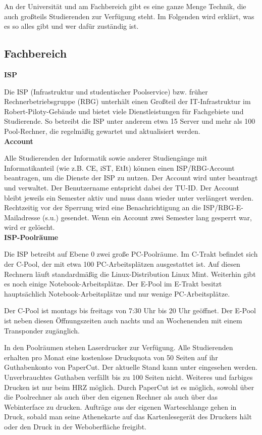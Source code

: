 {An der Universität und am Fachbereich gibt es eine ganze Menge Technik, die auch großteils Studierenden zur Verfügung steht. Im Folgenden wird erklärt, was es so alles gibt und wer dafür zuständig ist.
}{
\subsection*{Fachbereich}

\noindent\textbf{ISP}

Die ISP (Infrastruktur und studentischer Poolservice) \footnotemark[1] bzw. früher Rechnerbetriebsgruppe (RBG) unterhält einen Großteil der IT-Infrastruktur im Robert-Piloty-Gebäude und bietet viele Dienstleistungen für Fachgebiete und Studierende. So betreibt die ISP unter anderem etwa 15 Server und mehr als 100 Pool-Rechner, die regelmäßig gewartet und aktualisiert werden.\\

\noindent\textbf{Account}

Alle Studierenden der Informatik sowie anderer Studiengänge mit Informatikanteil (wie z.B. CE, iST, EtIt) können einen ISP/RBG-Account beantragen, um die Dienste der ISP zu nutzen. Der Account wird unter \footnotemark[2] beantragt und verwaltet. Der Benutzername entspricht dabei der TU-ID. Der Account bleibt jeweils ein Semester aktiv und muss dann wieder unter \footnotemark[2] verlängert werden. Rechtzeitig vor der Sperrung wird eine Benachrichtigung an die ISP/RBG-E-Mailadresse (s.u.) gesendet. Wenn ein Account zwei Semester lang gesperrt war, wird er gelöscht.\\

\noindent\textbf{ISP-Poolräume}

Die ISP betreibt auf Ebene 0 zwei große PC-Poolräume. Im C-Trakt befindet sich der C-Pool, der mit etwa 100 PC-Arbeitsplätzen ausgestattet ist. Auf diesen Rechnern läuft standardmäßig die Linux-Distribution Linux Mint. Weiterhin gibt es noch einige Notebook-Arbeitsplätze. Der E-Pool im E-Trakt besitzt hauptsächlich Notebook-Arbeitsplätze und nur wenige PC-Arbeitsplätze.

Der C-Pool ist montags bis freitags von 7:30 Uhr bis 20 Uhr geöffnet. Der E-Pool ist neben diesen Öffnungszeiten auch nachts und an Wochenenden mit einem Transponder zugänglich.

In den Poolräumen stehen Laserdrucker zur Verfügung. Alle Studierenden erhalten pro Monat eine kostenlose Druckquota von 50 Seiten auf ihr Guthabenkonto von PaperCut. Der aktuelle Stand kann unter \footnotemark[3] eingesehen werden. Unverbrauchtes Guthaben verfällt bis zu 100 Seiten nicht. Weiteres und farbiges Drucken ist nur beim HRZ möglich.
Durch PaperCut ist es möglich, sowohl über die Poolrechner als auch über den eigenen Rechner als auch über das Webinterface \footnotemark[3] zu drucken.
Aufträge aus der eigenen Warteschlange gehen in Druck, sobald man seine Athenekarte auf das Kartenlesegerät des Druckers hält oder den Druck in der Weboberfläche freigibt.

}
